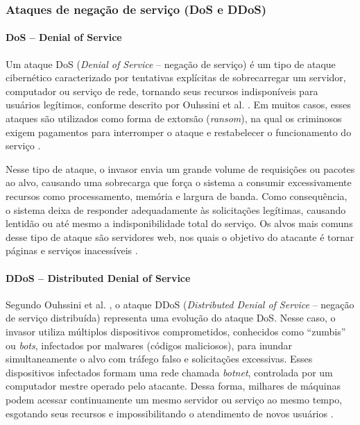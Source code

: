 \documentclass[
    12pt,                %
    openright,           %
    oneside,             %
    a4paper,             %
    english,             %
    brazil               %
]{abntex2}
\begin{document}
\subsubsection{Ataques de negação de serviço (DoS e DDoS)}

\paragraph{DoS -- Denial of Service}

Um ataque DoS (\textit{Denial of Service} -- negação de serviço) é um tipo de ataque cibernético caracterizado por tentativas explícitas de sobrecarregar um servidor, computador ou serviço de rede, tornando seus recursos indisponíveis para usuários legítimos, conforme descrito por Ouhssini et al. \cite{ouhssini2024}. Em muitos casos, esses ataques são utilizados como forma de extorsão (\textit{ransom}), na qual os criminosos exigem pagamentos para interromper o ataque e restabelecer o funcionamento do serviço \cite{ouhssini2024}.

Nesse tipo de ataque, o invasor envia um grande volume de requisições ou pacotes ao alvo, causando uma sobrecarga que força o sistema a consumir excessivamente recursos como processamento, memória e largura de banda. Como consequência, o sistema deixa de responder adequadamente às solicitações legítimas, causando lentidão ou até mesmo a indisponibilidade total do serviço. Os alvos mais comuns desse tipo de ataque são servidores web, nos quais o objetivo do atacante é tornar páginas e serviços inacessíveis \cite{ouhssini2024}.

\paragraph{DDoS -- Distributed Denial of Service}

Segundo Ouhssini et al. \cite{ouhssini2024}, o ataque DDoS (\textit{Distributed Denial of Service} -- negação de serviço distribuída) representa uma evolução do ataque DoS. Nesse caso, o invasor utiliza múltiplos dispositivos comprometidos, conhecidos como ``zumbis'' ou \textit{bots}, infectados por malwares (códigos maliciosos), para inundar simultaneamente o alvo com tráfego falso e solicitações excessivas. Esses dispositivos infectados formam uma rede chamada \textit{botnet}, controlada por um computador mestre operado pelo atacante. Dessa forma, milhares de máquinas podem acessar continuamente um mesmo servidor ou serviço ao mesmo tempo, esgotando seus recursos e impossibilitando o atendimento de novos usuários \cite{ouhssini2024,thaqi2026}.
\end{document}
